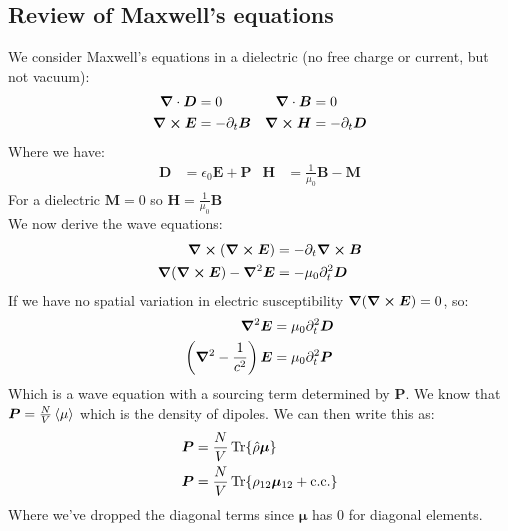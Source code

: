\subsection{Review of Maxwell's equations}
We consider Maxwell's equations in a dielectric (no free charge or current, but not vacuum):
\begin{align*}
	\bm{\nabla}\cdot\bm{D} &= 0 &
	\bm{\nabla}\cdot\bm{B} &= 0 \\
	\bm{\nabla}\cross\bm{E} &= -\partial_t\bm{B} &
	\bm{\nabla}\cross\bm{H} &= -\partial_t\bm{D}
\end{align*}
Where we have:
\begin{align*}
	\bm{D} &= \epsilon_0\bm{E} + \bm{P} &
	\bm{H} &= \frac{1}{\mu_0}\bm{B} - \bm{M}
\end{align*}
For a dielectric $\bm{M} = 0$ so $\bm{H} = \frac{1}{\mu_0}\bm{B}$ \\
We now derive the wave equations:
\begin{align*}
	\bm{\nabla}\cross(\bm{\nabla}\cross\bm{E}) &= -\partial_t\bm{\nabla}\cross\bm{B} \\
	\bm{\nabla}(\bm{\nabla}\cross\bm{E}) - \bm{\nabla}^2\bm{E}  &= -\mu_0\partial_t^2\bm{D}
\end{align*}
If we have no spatial variation in electric susceptibility $\bm{\nabla}(\bm{\nabla}\cross\bm{E}) =0$, so:
\begin{align*}
	\bm{\nabla}^2\bm{E}  &= \mu_0\partial_t^2\bm{D} \\
	\left(\bm{\nabla}^2 - \frac{1}{c^2}\right)\bm{E} &= \mu_0\partial_t^2\bm{P}
\end{align*}
Which is a wave equation with a sourcing term determined by $\bm{P}$. We know that $\bm{P} = \frac{N}{V} \expval{\mu}$ which is the density of dipoles. We can then write this as:
\begin{align*}
	\bm{P} &= \frac{N}{V} \Tr{\hat{\rho}\bm{\mu}} \\
	\bm{P} &= \frac{N}{V} \Tr{\rho_{12}\bm{\mu}_{12} + \text{c.c.}}
\end{align*}
Where we've dropped the diagonal terms since $\bm{\mu}$ has $0$ for diagonal elements. \\

